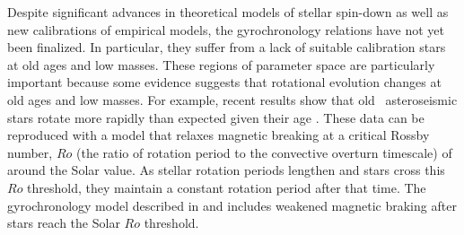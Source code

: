 Despite significant advances in theoretical models of stellar spin-down as
well as new calibrations of empirical models, the gyrochronology relations
have not yet been finalized.
In particular, they suffer from a lack of suitable calibration stars at old
ages and low masses.
These regions of parameter space are particularly important because some
evidence suggests that rotational evolution changes at old ages and low
masses.
For example, recent results show that old \kepler\ asteroseismic stars rotate
more rapidly than expected given their age \citep[\eg][]{Angus2015,
vansaders2016}.
These data can be reproduced with a model that relaxes magnetic breaking at a
critical Rossby number, $Ro$ (the ratio of rotation period to the convective
overturn timescale) of around the Solar value.
As stellar rotation periods lengthen and stars cross this $Ro$ threshold, they
maintain a constant rotation period after that time.
The gyrochronology model described in \citet{vansaders2016} and
\citet{vansaders2018} includes weakened magnetic braking after stars reach the
Solar $Ro$ threshold.

